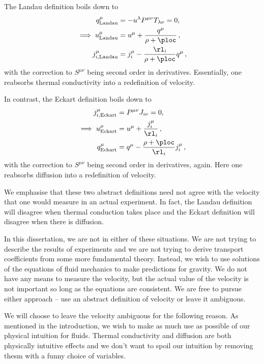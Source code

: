 The Landau definition boils down to
%
\begin{equation}\label{landau:eq}
  \begin{split}
    q^\mu_\text{Landau} &= -u^\lambda P^{\mu\nu} T_{\lambda\nu} =0 ,\\
    \implies
    u^\mu_\text{Landau} &= u^\mu +\frac{q^\mu}{\rho+\ploc}\,, \\
    j^\mu_{i,\text{Landau}} &= j^\mu_i -\frac{\rl_i}{\rho+\ploc}q^\mu \,,
  \end{split}
\end{equation}
%
with the correction to $S^{\mu\nu}$ being second order in derivatives. Essentially, one reabsorbs thermal conductivity into a redefinition of velocity.

In contrast, the Eckart definition boils down to
%
\begin{equation}\label{eckart:eq}
  \begin{split}
    j^\mu_{i,\text{Eckart}} &=  P^{\mu\nu} J_{i\nu} =0 ,\\
    \implies
    u^\mu_{\text{Eckart}} &= u^\mu + \frac{j^\mu_i}{\rl_i}\,,\\
    q^\mu_{\text{Eckart}} &= q^\mu - \frac{\rho+\ploc}{\rl_i}j^\mu_i\,,
  \end{split}
\end{equation}
%
with the correction to $S^{\mu\nu}$ being second order in derivatives, again. Here one reabsorbs diffusion into a redefinition of velocity.

We emphasise that these two abstract definitions need not agree with the velocity that one would measure in an actual experiment. In fact, the Landau definition will disagree when thermal conduction takes place and the Eckart definition will disagree when there is diffusion.

In this dissertation, we are not in either of these situations. We are not trying to describe the results of experiments and we are not trying to derive transport coefficients from some more fundamental theory. Instead, we wish to use solutions of the equations of fluid mechanics to make predictions for gravity. We do not have any means to measure the velocity, but the actual value of the velocity is not important so long as the equations are consistent. We are free to pursue either approach -- use an abstract definition of velocity or leave it ambiguous.

We will choose to leave the velocity ambiguous for the following reason. As mentioned in the introduction, we wish to make as much use as possible of our physical intuition for fluids. Thermal conductivity and diffusion are both physically intuitive effects and we don't want to spoil our intuition by removing thesm with a funny choice of variables.

